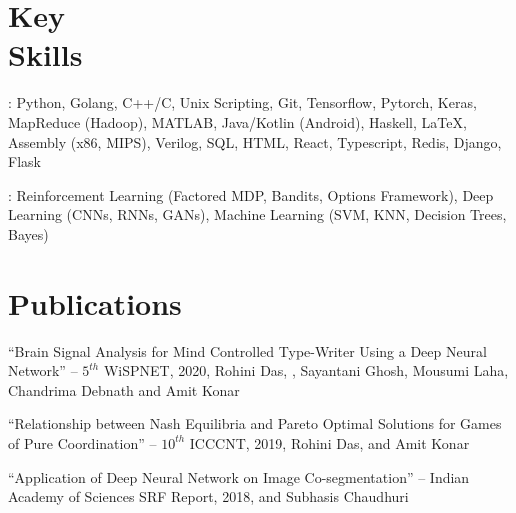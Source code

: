 \documentclass[mm]{simple_style}
\begin{document}
\begin{resume}
\section{Key\\Skills}
: Python, Golang, C++/C, Unix Scripting, Git, Tensorflow, Pytorch, Keras, MapReduce (Hadoop), MATLAB, Java/Kotlin (Android), Haskell, \LaTeX, Assembly (x86, MIPS), Verilog, SQL, HTML, React, Typescript, Redis, Django, Flask
\\

\vspace{-4ex}

: Reinforcement Learning (Factored MDP, Bandits, Options Framework), Deep Learning (CNNs, RNNs, GANs), Machine Learning (SVM, KNN, Decision Trees, Bayes)

\vspace{-2ex}
\sectionline


\newpage
\sectionline

\section{Publications}
``Brain Signal Analysis for Mind Controlled Type-Writer Using a Deep Neural Network'' -- $5^{th}$ WiSPNET, 2020, Rohini Das, , Sayantani Ghosh, Mousumi Laha, Chandrima Debnath and Amit Konar\\

\vspace{-4ex}

``Relationship between Nash Equilibria and Pareto Optimal Solutions for Games of Pure Coordination'' -- $10^{th}$ ICCCNT, 2019, Rohini Das,  and Amit Konar\\

\vspace{-4ex}

``Application of Deep Neural Network on Image Co-segmentation'' -- Indian Academy of Sciences SRF Report, 2018,  and Subhasis Chaudhuri


\end{resume}
\end{document}
